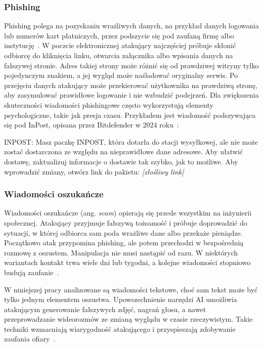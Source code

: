 \subsubsection{Phishing}

Phishing polega na pozyskaniu wrażliwych danych, na przykład danych logowania
lub numerów kart płatniczych, przez podszycie się pod zaufaną firmę albo
instytucję~\autocite{nist-csrc-phishing-glossary}. W poczcie elektronicznej
atakujący najczęściej próbuje skłonić odbiorcę do kliknięcia linku, otwarcia
załącznika albo wpisania danych na fałszywej stronie. Adres takiej strony może
różnić się od prawdziwej witryny tylko pojedynczym znakiem, a jej wygląd może
naśladować oryginalny serwis. Po przejęciu danych atakujący może przekierować
użytkownika na prawdziwą stronę, aby zasymulować prawidłowe logowanie i nie
wzbudzić podejrzeń. Dla zwiększenia skuteczności wiadomości phishingowe często
wykorzystują elementy psychologiczne, takie jak presja czasu. Przykładem jest
wiadomość podszywająca się pod InPost, opisana przez Bitdefender w 2024
roku~\autocite{bitdefender-inpost-phishing-2024}:

\begin{framed}
\begin{displayquote}
\small\ttfamily\raggedright
INPOST: Masz paczkę 
INPOST, która dotarła do
stacji wysyłkowej, ale nie
może zostać dostarczona
ze względu na
nieprawidłowe dane
adresowe. Aby ułatwić
dostawę, zaktualizuj
informacje o dostawie tak
szybko, jak to możliwe. Aby
wprowadzić zmiany, otwórz
link do pakietu: \textit{[złośliwy link]}
\end{displayquote}
\end{framed}


\subsubsection{Wiadomości oszukańcze}

Wiadomości oszukańcze (ang. \emph{scam}) opierają się przede wszystkim na
inżynierii społecznej. Atakujący przyjmuje fałszywą tożsamość i próbuje
doprowadzić do sytuacji, w której odbiorca sam poda wrażliwe dane albo przekaże
pieniądze. Początkowo atak przypomina phishing, ale potem przechodzi w bezpośrednią rozmowę z oszustem.
Manipulacja nie musi nastąpić od razu. W niektórych wariantach kontakt trwa wiele dni lub tygodni,
a kolejne wiadomości stopniowo budują zaufanie~\autocite{advance-fee-fraud}.

W niniejszej pracy analizowane są wiadomości tekstowe, choć sam tekst może być
tylko jednym elementem oszustwa. Upowszechnienie narzędzi AI umożliwia atakującym
generowanie fałszywych zdjęć, nagrań głosu, a nawet przeprowadzanie wideorozmów ze zmianą
wyglądu w czasie rzeczywistym. Takie techniki wzmacniają wiarygodność atakującego i przyspieszają
zdobywanie zaufania ofiary~\autocite{pedersen-deepfake-social-engineering-2025}.

